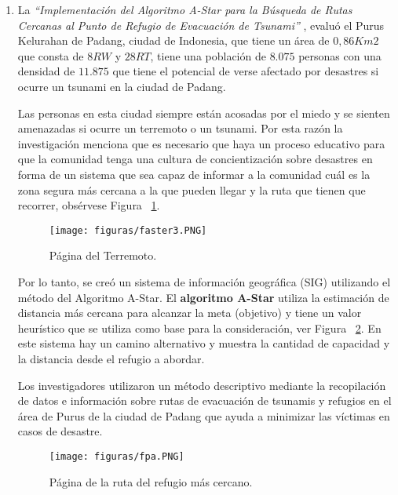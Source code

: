 \documentclass[10pt,conference]{IEEEtran}
\begin{document}
\begin{enumerate}
\item La \textit{“Implementación del Algoritmo A-Star para la Búsqueda de Rutas Cercanas al Punto de Refugio de Evacuación de Tsunami”} \citep{astri2020implementation}, evaluó el Purus Kelurahan de Padang, ciudad de Indonesia, que tiene un área de $0,86 Km2$ que consta de $8 RW$ y $28 RT$, tiene una población de $8.075$ personas con una densidad de $11.875$ que tiene el potencial de verse afectado por desastres si ocurre un tsunami en la ciudad de Padang.

Las personas en esta ciudad siempre están acosadas por el miedo y se sienten amenazadas si ocurre un terremoto o un tsunami. Por esta razón la investigación menciona que es necesario que haya un proceso educativo para que la comunidad tenga una cultura de concientización sobre desastres en forma de un sistema que sea capaz de informar a la comunidad cuál es la zona segura más cercana a la que pueden llegar y la ruta que tienen que recorrer, obsérvese Figura  ~\ref{faster3}.

\begin{figure}[H]
 \begin{center}
       \texttt{[image: figuras/faster3.PNG]}
      \caption{Página del Terremoto.}
      \label{faster3} 
      \end{center}
\end{figure}

Por lo tanto, se creó un sistema de información geográfica (SIG) utilizando el método del Algoritmo A-Star. El \textbf{algoritmo A-Star} utiliza la estimación de distancia más cercana para alcanzar la meta (objetivo) y tiene un valor heurístico que se utiliza como base para la consideración, ver Figura  ~\ref{fpa}. En este sistema hay un camino alternativo y muestra la cantidad de capacidad y la distancia desde el refugio a abordar. 

Los investigadores utilizaron un método descriptivo mediante la recopilación de datos e información sobre rutas de evacuación de tsunamis y refugios en el área de Purus de la ciudad de Padang que ayuda a minimizar las víctimas en casos de desastre.

\begin{figure}[H]
 \begin{center}
       \texttt{[image: figuras/fpa.PNG]}
      \caption{Página de la ruta del refugio más cercano.}
      \label{fpa} 
      \end{center}
\end{figure}
\end{enumerate}
\end{document}
